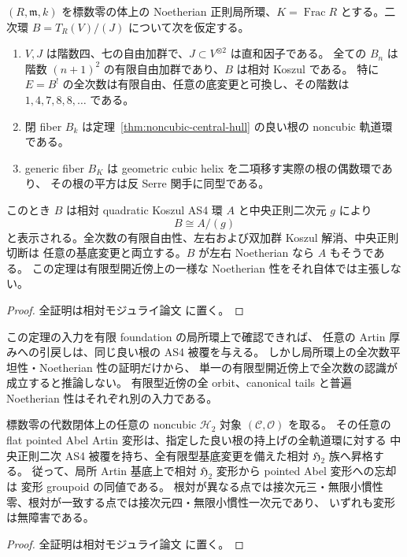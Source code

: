 \begin{theorem}
\label{thm:noncubic-local-central-hull}
\((R,\mathfrak m,k)\) を標数零の体上の Noetherian 正則局所環、\(K=\operatorname{Frac}R\)
とする。二次環 \(B=T_R(V)/(J)\) について次を仮定する。
\begin{enumerate}
\item \(V,J\) は階数四、七の自由加群で、\(J\subset V^{\otimes2}\) は直和因子である。
全ての \(B_n\) は階数 \((n+1)^2\) の有限自由加群であり、\(B\) は相対 Koszul である。
特に \(E=B^!\) の全次数は有限自由、任意の底変更と可換し、その階数は
\(1,4,7,8,8,\ldots\) である。
\item 閉 fiber \(B_k\) は定理~\ref{thm:noncubic-central-hull} の良い根の
noncubic 軌道環である。
\item generic fiber \(B_K\) は geometric cubic helix を二項移す実際の根の偶数環であり、
その根の平方は反 Serre 関手に同型である。
\end{enumerate}
このとき \(B\) は相対 quadratic Koszul AS4 環 \(A\) と中央正則二次元 \(g\) により
\[
 B\cong A/(g)
\]
と表示される。全次数の有限自由性、左右および双加群 Koszul 解消、中央正則切断は
任意の基底変更と両立する。\(B\) が左右 Noetherian なら \(A\) もそうである。
この定理は有限型開近傍上の一様な Noetherian 性をそれ自体では主張しない。
\end{theorem}

\begin{proof}
全証明は相対モジュライ論文 \cite[\texttt{noncubic_local_tails}]{QuadricModuli2026} に置く。
\end{proof}

\begin{remark}
この定理の入力を有限 foundation の局所環上で確認できれば、
任意の Artin 厚みへの引戻しは、同じ良い根の AS4 被覆を与える。
しかし局所環上の全次数平坦性・Noetherian 性の証明だけから、
単一の有限型開近傍上で全次数の認識が成立すると推論しない。
有限型近傍の全 orbit、canonical tails と普遍 Noetherian 性はそれぞれ別の入力である。
\end{remark}

\begin{corollary}
\label{cor:noncubic-all-artin-h2}
標数零の代数閉体上の任意の noncubic \(\mathcal H_2\) 対象
\((\mathcal C,\mathcal O)\) を取る。
その任意の flat pointed Abel Artin 変形は、指定した良い根の持上げの全軌道環に対する
中央正則二次 AS4 被覆を持ち、全有限型基底変更を備えた相対 \(\mathfrak H_2\) 族へ昇格する。
従って、局所 Artin 基底上で相対 \(\mathfrak H_2\) 変形から pointed Abel 変形への忘却は
変形 groupoid の同値である。
根対が異なる点では接次元三・無限小慣性零、根対が一致する点では接次元四・無限小慣性一次元であり、
いずれも変形は無障害である。
\end{corollary}
\begin{proof}
全証明は相対モジュライ論文 \cite[\texttt{noncubic_local_tails}]{QuadricModuli2026} に置く。
\end{proof}

